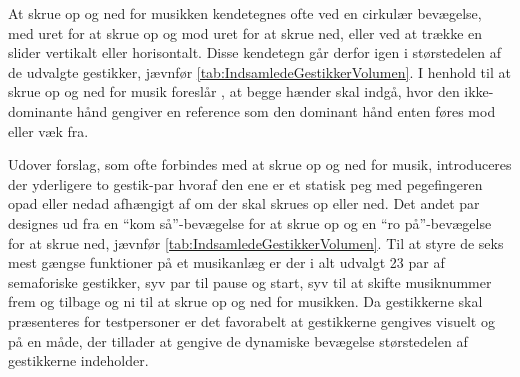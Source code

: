 \noindent
%
At skrue op og ned for musikken kendetegnes ofte ved en cirkulær bevægelse, med uret for at skrue op og mod uret for at skrue ned, eller ved at trække en slider vertikalt eller horisontalt. Disse kendetegn går derfor igen i størstedelen af de udvalgte gestikker, jævnfør \autoref{tab:IndsamledeGestikkerVolumen}. I henhold til at skrue op og ned for musik foreslår \textcite[s. 48]{PDF:UserDefinedGesturesTV}, at begge hænder skal indgå, hvor den ikke-dominante hånd gengiver en reference som den dominant hånd enten føres mod eller væk fra.

Udover forslag, som ofte forbindes med at skrue op og ned for musik, introduceres der yderligere to gestik-par hvoraf den ene er et statisk peg med pegefingeren opad eller nedad afhængigt af om der skal skrues op eller ned. Det andet par designes ud fra en \enquote{kom så}-bevægelse for at skrue op og en \enquote{ro på}-bevægelse for at skrue ned, jævnfør \autoref{tab:IndsamledeGestikkerVolumen}. \blankline
%
Til at styre de seks mest gængse funktioner på et musikanlæg er der i alt udvalgt 23 par af semaforiske gestikker, syv par til pause og start, syv til at skifte musiknummer frem og tilbage og ni til at skrue op og ned for musikken. Da gestikkerne skal præsenteres for testpersoner er det favorabelt at gestikkerne gengives visuelt og på en måde, der tillader at gengive de dynamiske bevægelse størstedelen af gestikkerne indeholder. 
%
